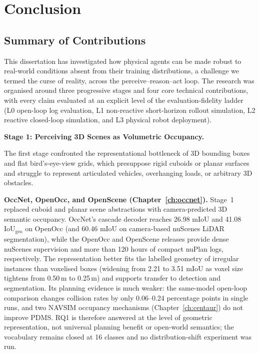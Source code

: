 \chapter{Conclusion}\label{ch:conclusion}

\section{Summary of Contributions}\label{sec:concl:summary}

This dissertation has investigated how physical agents can be made robust to real-world conditions absent from their training distributions, a challenge we termed the curse of reality, across the perceive--reason--act loop. The research was organised around three progressive stages and four core technical contributions, with every claim evaluated at an explicit level of the evaluation-fidelity ladder (L0 open-loop log evaluation, L1 non-reactive short-horizon rollout simulation, L2 reactive closed-loop simulation, and L3 physical robot deployment).

\medskip
\noindent\textbf{Stage 1: Perceiving 3D Scenes as Volumetric Occupancy.}

The first stage confronted the representational bottleneck of 3D bounding boxes and flat bird's-eye-view grids, which presuppose rigid cuboids or planar surfaces and struggle to represent articulated vehicles, overhanging loads, or arbitrary 3D obstacles.

\textbf{OccNet, OpenOcc, and OpenScene (Chapter~\ref{ch:occnet}).} Stage~1 replaced cuboid and planar scene abstractions with camera-predicted 3D semantic occupancy. OccNet's cascade decoder reaches 26.98 mIoU and 41.08 $\text{IoU}_{\text{geo}}$ on OpenOcc (and 60.46 mIoU on camera-based nuScenes LiDAR segmentation), while the OpenOcc and OpenScene releases provide dense nuScenes supervision and more than 120 hours of compact nuPlan logs, respectively. The representation better fits the labelled geometry of irregular instances than voxelised boxes (widening from 2.21 to 3.51 mIoU as voxel size tightens from 0.50\,m to 0.25\,m) and supports transfer to detection and segmentation. Its planning evidence is much weaker: the same-model open-loop comparison changes collision rates by only 0.06--0.24 percentage points in single runs, and two NAVSIM occupancy mechanisms (Chapter~\ref{ch:centaur}) do not improve PDMS. RQ1 is therefore answered at the level of geometric representation, not universal planning benefit or open-world semantics; the vocabulary remains closed at 16 classes and no distribution-shift experiment was run.

